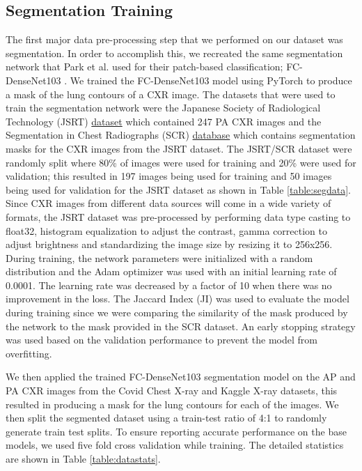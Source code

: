 \documentclass{sigkddExp}
\begin{document}
\subsection{Segmentation Training}
The first major data pre-processing step that we performed on our dataset was
segmentation. In order to accomplish this, we recreated the same segmentation
network that Park et al. used for their patch-based classification;
FC-DenseNet103 \cite{DBLP:journals/corr/JegouDVRB16}. We trained the
FC-DenseNet103 model using PyTorch to produce a mask of the lung contours of a
CXR image. The datasets that were used to train the segmentation network were
the Japanese Society of Radiological Technology (JSRT)
\href{http://db.jsrt.or.jp/eng.php}{dataset} which contained 247 PA CXR images
and the Segmentation in Chest Radiographs (SCR)
\href{https://www.isi.uu.nl/Research/Databases/SCR/}{database} which contains
segmentation masks for the CXR images from the JSRT dataset. The JSRT/SCR
dataset were randomly split where 80\% of images were used for training and 20\%
were used for validation; this resulted in 197 images being used for training
and 50 images being used for validation for the JSRT dataset as shown in Table
\ref{table:segdata}. Since CXR images from different data sources will come in a
wide variety of formats, the JSRT dataset was pre-processed by performing data
type casting to float32, histogram equalization to adjust the contrast, gamma
correction to adjust brightness and standardizing the image size by resizing it
to 256x256. During training, the network parameters were initialized with a
random distribution and the Adam optimizer was used with an initial learning
rate of 0.0001. The learning rate was decreased by a factor of 10 when there was
no improvement in the loss. The Jaccard Index (JI) was used to evaluate the
model during training since we were comparing the similarity of the mask
produced by the network to the mask provided in the SCR dataset. An early
stopping strategy was used based on the validation performance to prevent the
model from overfitting.

We then applied the trained FC-DenseNet103 segmentation model on the AP and PA
CXR images from the Covid Chest X-ray and Kaggle X-ray datasets, this resulted
in producing a mask for the lung contours for each of the images. We then split
the segmented dataset using a train-test ratio of 4:1 to randomly generate train
test splits. To ensure reporting accurate performance on the base models, we
used five fold cross validation while training. The detailed statistics are
shown in Table \ref{table:datastats}.
\end{document}
